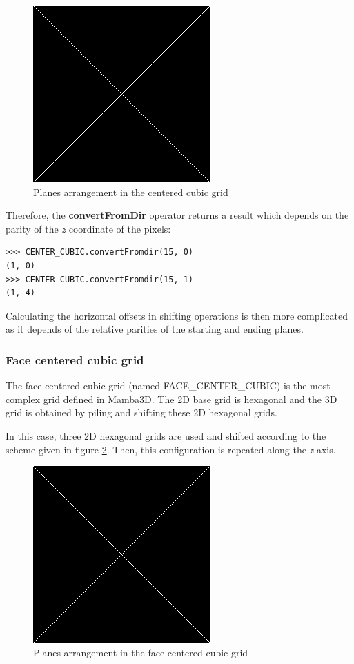 \documentclass[a4paper,10pt,oneside]{article}
\begin{document}
\begin{figure}
\centering
\includegraphics[scale=0.3]{figures/xxx.png}
\caption{Planes arrangement in the centered cubic grid}
\label{fig:CC_grid}
\end{figure}

Therefore, the \textbf{convertFromDir} operator returns a result which depends on the parity of the \emph{z} coordinate of the pixels:

\lstset{language=Python}
\begin{lstlisting}
>>> CENTER_CUBIC.convertFromdir(15, 0)
(1, 0)
>>> CENTER_CUBIC.convertFromdir(15, 1)
(1, 4)
\end{lstlisting}

Calculating the horizontal offsets in shifting operations is then more complicated as it depends of the relative parities
of the starting and ending planes.

\subsubsection{Face centered cubic grid}
\label{cha:FCCgrid}
The face centered cubic grid (named FACE\_CENTER\_CUBIC) is the most complex grid defined in Mamba3D. The 2D base grid is hexagonal
and the 3D grid is obtained by piling and shifting these 2D hexagonal grids.

In this case, three 2D hexagonal grids are used and shifted according to the scheme given in figure \ref{fig:FCC_grid}. Then, this configuration
is repeated along the \emph{z} axis.

\begin{figure}
\centering
\includegraphics[scale=0.3]{figures/xxx.png}
\caption{Planes arrangement in the face centered cubic grid}
\label{fig:FCC_grid}
\end{figure}
\end{document}
